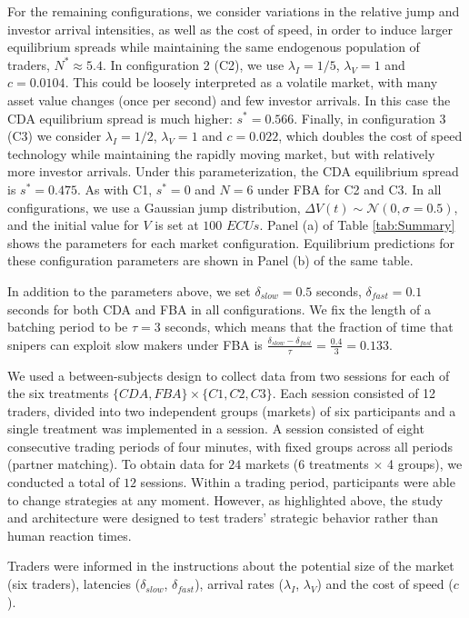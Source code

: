 \documentclass[12pt]{article}
\begin{document}
For the remaining configurations, we consider variations in the relative jump and investor arrival intensities, as well as the cost of speed, in order to induce larger equilibrium spreads while maintaining the same endogenous population of traders, $N^* \approx 5.4$. In configuration 2 (C2), we use $\lambda_I=1/5$, $\lambda_V=1$ and $c=0.0104$. This could be loosely interpreted as a volatile market, with many asset value changes (once per second) and few investor arrivals. In this case the CDA equilibrium spread is much higher: $s^* = 0.566$. Finally, in configuration 3 (C3) we consider $\lambda_I=1/2$, $\lambda_V=1$ and $c=0.022$, which doubles the cost of speed technology while maintaining the rapidly moving market, but with relatively more investor arrivals. Under this parameterization, the CDA equilibrium spread is $s^* = 0.475$. As with C1, $s^* = 0$ and $N=6$ under FBA for C2 and C3. 
In all configurations, we use a Gaussian jump distribution, $\Delta V(t) \sim \mathcal{N}(0,\sigma=0.5)$,  and the initial value for $V$ is set  at $100$ $ECUs$. Panel (a) of Table \ref{tab:Summary} shows the parameters for each market configuration. Equilibrium predictions for these configuration parameters are shown in Panel (b) of the same table.

In addition to the parameters above, we set $\delta_{slow} = 0.5$ seconds, $\delta_{fast} = 0.1$ seconds for both CDA and FBA in all configurations. We fix the length of a batching period to be $\tau = 3$ seconds, which means that the fraction of time that snipers can exploit slow makers under FBA is $\frac{\delta_{slow}-\delta_{fast}}{\tau} = \frac{0.4}{3} = 0.133$.

We used a between-subjects design to collect data from two sessions for each of the six treatments $\{ CDA, FBA\} \times \{C1,C2,C3\}$. Each session consisted of 12 traders, divided into two independent groups (markets) of six participants and a single treatment was implemented in a session. A session consisted of eight consecutive trading periods of four minutes, with fixed groups across all periods (partner matching). To obtain data for $24$ markets  ($6$ treatments $\times$ 4 groups), we conducted a total of $12$ sessions. Within a trading period, participants were able to change strategies at any moment. However, as highlighted above, the study and architecture were designed to test traders' strategic behavior rather than human reaction times.

Traders were informed in the instructions about the potential size of the market (six traders), latencies ($\delta_{slow}$, $\delta_{fast}$), arrival rates ($\lambda_I$, $\lambda_V$) and  the cost of speed ($c$). 
\end{document}
